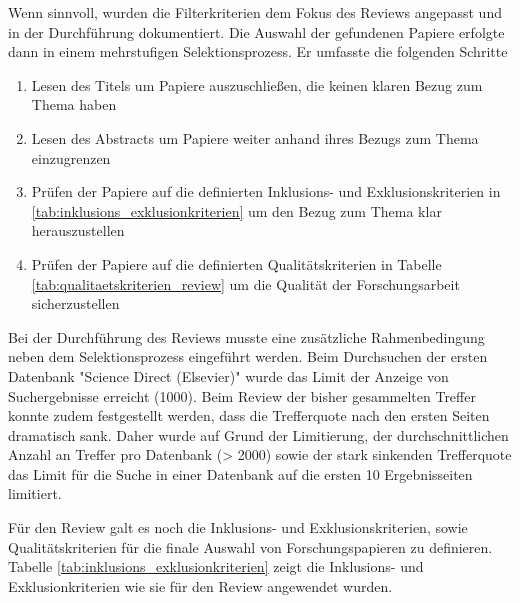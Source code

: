 Wenn sinnvoll, wurden die Filterkriterien dem Fokus des Reviews angepasst und in der Durchführung dokumentiert. Die Auswahl der gefundenen Papiere erfolgte dann in einem mehrstufigen Selektionsprozess. Er umfasste die folgenden Schritte

\begin{enumerate}
    \item Lesen des Titels um Papiere auszuschließen, die keinen klaren Bezug zum Thema haben
    \item Lesen des Abstracts um Papiere weiter anhand ihres Bezugs zum Thema einzugrenzen
    \item Prüfen der Papiere auf die definierten Inklusions- und Exklusionskriterien in \ref{tab:inklusions_exklusionkriterien} um den Bezug zum Thema klar herauszustellen
    \item Prüfen der Papiere auf die definierten Qualitätskriterien in Tabelle \ref{tab:qualitaetskriterien_review} um die Qualität der Forschungsarbeit sicherzustellen
\end{enumerate}

Bei der Durchführung des Reviews musste eine zusätzliche Rahmenbedingung neben dem Selektionsprozess eingeführt werden. Beim Durchsuchen der ersten Datenbank "Science Direct (Elsevier)" wurde das Limit der Anzeige von Suchergebnisse erreicht (1000). Beim Review der bisher gesammelten Treffer konnte zudem festgestellt werden, dass die Trefferquote nach den ersten Seiten dramatisch sank. Daher wurde auf Grund der Limitierung, der durchschnittlichen Anzahl an Treffer pro Datenbank (> 2000) sowie der stark sinkenden Trefferquote das Limit für die Suche in einer Datenbank auf die ersten 10 Ergebnisseiten limitiert.

Für den Review galt es noch die Inklusions- und Exklusionskriterien, sowie Qualitätskriterien für die finale Auswahl von Forschungspapieren zu definieren. Tabelle \ref{tab:inklusions_exklusionkriterien} zeigt die Inklusions- und Exklusionkriterien wie sie für den Review angewendet wurden.


